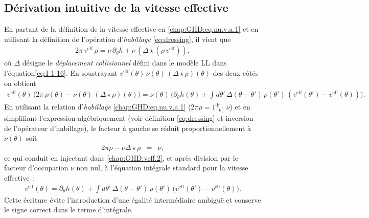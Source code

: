 \subsection{Dérivation intuitive de la vitesse effective}

En partant de la définition de la vitesse effective en \eqref{chap:GHD:eq.nu.v.a.1} et en utilisant la définition de l’opération d’\emph{habillage} \eqref{eq:dressing}, il vient que 
\begin{eqnarray}\label{chap:GHD:veff.1}
	2 \pi \, v^{\mathrm{eff}} \,   \rho   = \nu  \,  \partial_\theta h   + \nu  \,  \left ( \Delta \star ( \rho \,  v^{\mathrm{eff}} )  \right ) ,
\end{eqnarray}
{%
où $\Delta$ désigne le {\em déplacement collisionnel} défini dans le modèle \gls{LL} dans l'équation\eqref{eq:I-1-16}.
En soustrayant $v^{\mathrm{eff}}(\theta)\,\nu(\theta)\,(\Delta\star\rho)(\theta)$ des deux côtés on obtient
\begin{eqnarray}\label{chap:GHD:veff.2}
	v^{\mathrm{eff}}(\theta)\,\Big(2\pi\,\rho(\theta)-\nu(\theta)\,(\Delta\star\rho)(\theta)\Big)
	= \nu(\theta)\,\Big(\partial_\theta h(\theta)
	+ \int d\theta'\,\Delta(\theta-\theta')\,\rho(\theta')\,(v^{\mathrm{eff}}(\theta')-v^{\mathrm{eff}}(\theta))\Big).
\end{eqnarray}
En utilisant la relation d'\emph{habillage} \eqref{chap:GHD:eq.nu.v.a.1} ($2\pi\rho=1^{\mathrm{dr}}_{[\nu]}\,\nu$) et en simplifiant l'expression algébriquement (voir définition \eqref{eq:dressing} et inversion de l'opérateur d'habillage), le facteur à gauche se réduit proportionnellement à $\nu(\theta)$ soit 
\begin{eqnarray}
	2 \pi \rho - \nu \Delta \star \rho & = & \nu ,
\end{eqnarray}
	ce qui conduit en injectant dans \eqref{chap:GHD:veff.2}, et après division par le facteur d'occupation $\nu$ non nul, à l'équation intégrale standard pour la vitesse effective :
\begin{eqnarray}\label{chap:GHD:veff.4}
	v^{\mathrm{eff}}(\theta)
	= \partial_\theta h(\theta)
	+ \int d\theta'\,\Delta(\theta-\theta')\,\rho(\theta')\,
	\big(v^{\mathrm{eff}}(\theta')-v^{\mathrm{eff}}(\theta)\big).
\end{eqnarray}
Cette écriture évite l'introduction d'une égalité intermédiaire ambiguë et conserve le signe correct dans le terme d'intégrale.}

\medskip

